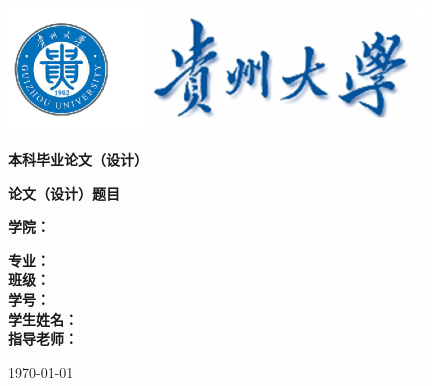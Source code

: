 
\begin{titlepage}

\begin{center}
\vspace{0cm}
\includegraphics[width=11cm]{hh.eps}

\vspace{1.4cm}

\heiti{}\textbf{本科毕业论文（设计）}
\end{center}



\vspace{2.5cm}
\heiti{}\textbf{论文（设计）题目}
\vspace{1.6cm}
\begin{center}
\renewcommand{\ULthickness}{0.9pt}\setlength{\ULdepth}{4pt}
\heiti\textbf{学\qquad 院：}\uline{\kaishu{}}\par  \vspace{0.3cm}
\heiti\textbf{专\qquad 业：}\uline{\kaishu{}}\\ \vspace{0.3cm}
\heiti\textbf{班\qquad 级：}\uline{\kaishu{}}\\  \vspace{0.3cm}
\heiti\textbf{学\qquad 号：}\uline{\kaishu{}}\\  \vspace{0.3cm}
\heiti\textbf{学生姓名：}\uline{\kaishu{}}\\  \vspace{0.3cm}
\heiti\textbf{指导老师：}\uline{\kaishu\makebox[45mm]{}}\\ \vspace{2.6cm}

\today
\end{center}
\end{titlepage}
